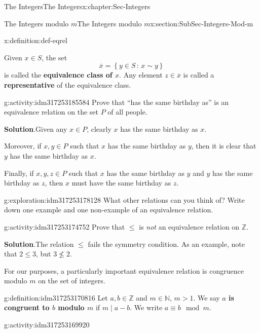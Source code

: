 \documentclass[oneside,10pt,]{book}
\newcommand{\blocktitlefont}{\relax}
\newcommand{\terminology}[1]{\textbf{#1}}
\numberwithin{equation}{section}
\renewcommand{\le}{\leqslant}
\newcommand{\setof}[2]{{\left\{#1\,\colon\,#2\right\}}}
\def\Z{{\mathbb Z}}
\def\N{{\mathbb N}}
\begin{document}
\begin{chapterptx}{The Integers}{}{The Integers}{}{}{x:chapter:Sec-Integers}
\begin{sectionptx}{The Integers modulo \(m\)}{}{The Integers modulo \(m\)}{}{}{x:section:SubSec-Integers-Mod-m}
\begin{definition}{}{x:definition:def-eqrel}
\begin{itemize}[label=\textbullet]
\end{itemize}
%
\par
Given \(x\in S\), the set%
\begin{equation*}
\overline{x} = \setof{y\in S}{x\sim y}
\end{equation*}
is called the \terminology{equivalence class of \(x\)}. Any element \(z\in \overline{x}\) is called a \terminology{representative} of the equivalence class.%
\end{definition}
\begin{activity}{}{g:activity:idm317253185584}%
Prove that ``has the same birthday as'' is an equivalence relation on the set \(P\) of all people.%
\par\smallskip%
\noindent\textbf{\blocktitlefont Solution}.\hypertarget{g:solution:idm317253182096}{}\quad{}Given any \(x\in P\), clearly \(x\) has the same birthday as \(x\).%
\par
Moreover, if \(x,y\in P\) such that \(x\) has the same birthday as \(y\), then it is clear that \(y\) has the same birthday as \(x\).%
\par
Finally, if \(x,y,z\in P\) such that \(x\) has the same birthday as \(y\) and \(y\) has the same birthday as \(z\), then \(x\) must have the same birthday as \(z\).%
\end{activity}
\begin{exploration}{}{g:exploration:idm317253178128}%
What other relations can you think of? Write down one example and one non-example of an equivalence relation.%
\end{exploration}
\begin{activity}{}{g:activity:idm317253174752}%
Prove that \(\le\) is \emph{not} an equivalence relation on \(\Z\).%
\par\smallskip%
\noindent\textbf{\blocktitlefont Solution}.\hypertarget{g:solution:idm317253173088}{}\quad{}The relation \(\le\) fails the symmetry condition. As an example, note that \(2 \le 3\), but \(3\not\le 2\).%
\end{activity}
For our purposes, a particularly important equivalence relation is congruence modulo \(m\) on the set of integers.%
\begin{definition}{}{g:definition:idm317253170816}%
%
Let \(a,b\in \Z\) and \(m \in \N\), \(m > 1\). We say \terminology{\(a\) is congruent to \(b\) modulo \(m\)} if \(m\mid a-b\). We write \(a \equiv b\mod m\).%
\end{definition}
\begin{activity}{}{g:activity:idm317253169920}%

\end{activity}
\end{sectionptx}
\end{chapterptx}
\end{document}
